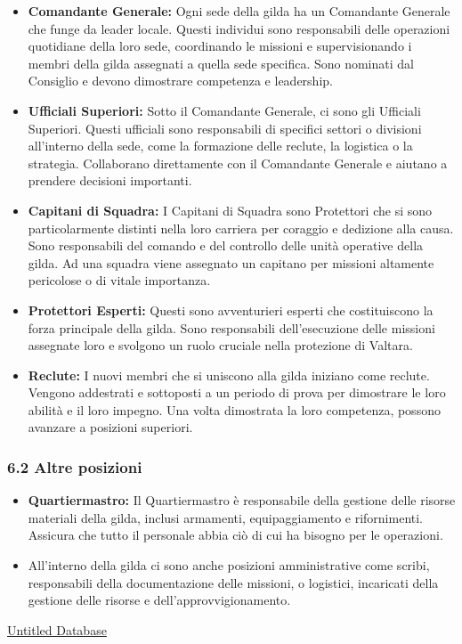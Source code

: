 \begin{itemize}
\tightlist
\item
  \textbf{Comandante Generale:} Ogni sede della gilda ha un Comandante
  Generale che funge da leader locale. Questi individui sono
  responsabili delle operazioni quotidiane della loro sede, coordinando
  le missioni e supervisionando i membri della gilda assegnati a quella
  sede specifica. Sono nominati dal Consiglio e devono dimostrare
  competenza e leadership.
\item
  \textbf{Ufficiali Superiori:} Sotto il Comandante Generale, ci sono
  gli Ufficiali Superiori. Questi ufficiali sono responsabili di
  specifici settori o divisioni all'interno della sede, come la
  formazione delle reclute, la logistica o la strategia. Collaborano
  direttamente con il Comandante Generale e aiutano a prendere decisioni
  importanti.
\item
  \textbf{Capitani di Squadra:} I Capitani di Squadra sono Protettori
  che si sono particolarmente distinti nella loro carriera per coraggio
  e dedizione alla causa. Sono responsabili del comando e del controllo
  delle unità operative della gilda. Ad una squadra viene assegnato un
  capitano per missioni altamente pericolose o di vitale importanza.
\item
  \textbf{Protettori Esperti:} Questi sono avventurieri esperti che
  costituiscono la forza principale della gilda. Sono responsabili
  dell'esecuzione delle missioni assegnate loro e svolgono un ruolo
  cruciale nella protezione di Valtara.
\item
  \textbf{Reclute:} I nuovi membri che si uniscono alla gilda iniziano
  come reclute. Vengono addestrati e sottoposti a un periodo di prova
  per dimostrare le loro abilità e il loro impegno. Una volta dimostrata
  la loro competenza, possono avanzare a posizioni superiori.
\end{itemize}

\subsubsection{\texorpdfstring{6.2 \textbf{Altre
posizioni}}{6.2 Altre posizioni}}\label{altre-posizioni}

\begin{itemize}
\tightlist
\item
  \textbf{Quartiermastro:} Il Quartiermastro è responsabile della
  gestione delle risorse materiali della gilda, inclusi armamenti,
  equipaggiamento e rifornimenti. Assicura che tutto il personale abbia
  ciò di cui ha bisogno per le operazioni.
\item
  All'interno della gilda ci sono anche posizioni amministrative come
  scribi, responsabili della documentazione delle missioni, o logistici,
  incaricati della gestione delle risorse e dell'approvvigionamento.
\end{itemize}

\href{Untitled\%20Database\%2077b97fb33d1b4871909da1f0d726e8dc.csv}{Untitled
Database}
